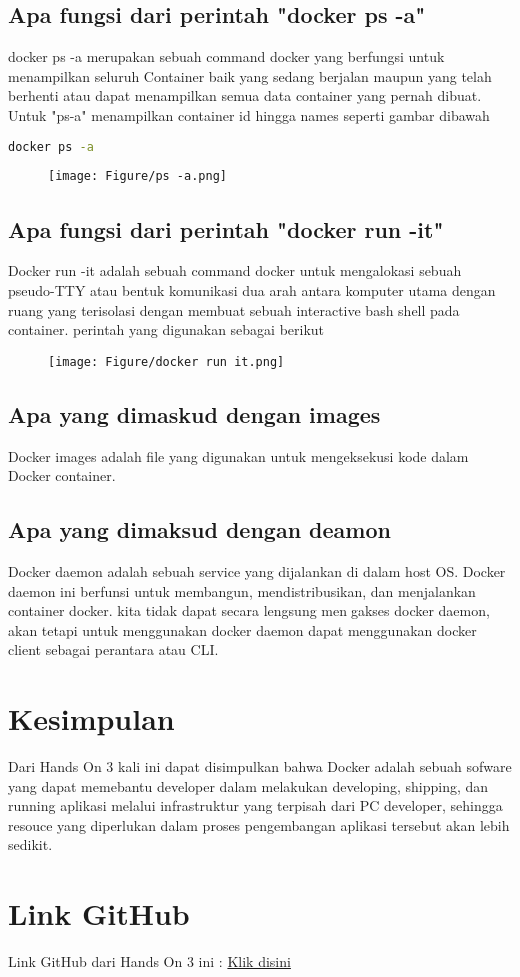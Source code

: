 \documentclass[11pt,a4paper]{article}
\begin{document}
\subsection{Apa fungsi dari perintah "docker ps -a"}

docker ps -a merupakan sebuah command docker yang berfungsi untuk menampilkan seluruh Container baik yang sedang berjalan maupun yang telah berhenti atau dapat menampilkan semua data container yang pernah
dibuat. Untuk "ps-a" menampilkan container id hingga names seperti gambar dibawah
\begin{lstlisting}[language = bash]
	docker ps -a
\end{lstlisting}
\begin{figure}[h]
	\centering
	\texttt{[image: Figure/ps -a.png]}
\end{figure}

\newpage
\subsection{Apa fungsi dari perintah "docker run -it"}
Docker run -it adalah sebuah command docker untuk mengalokasi sebuah pseudo-TTY atau bentuk komunikasi dua arah antara komputer utama dengan ruang yang terisolasi dengan membuat sebuah interactive
bash shell pada container. perintah yang digunakan sebagai berikut
\begin{figure}[h]
	\centering
	\texttt{[image: Figure/docker run it.png]}
\end{figure}


\subsection{Apa yang dimaskud dengan images}
Docker images adalah file yang digunakan untuk mengeksekusi kode dalam Docker container.

\subsection{Apa yang dimaksud dengan deamon}
Docker daemon adalah sebuah service yang dijalankan di dalam host OS. Docker daemon ini berfunsi untuk
membangun, mendistribusikan, dan menjalankan container docker. kita tidak dapat secara lengsung mengakses docker daemon, akan tetapi untuk menggunakan docker daemon dapat menggunakan docker client sebagai perantara atau CLI.\cite{contributor_2005}
\section{Kesimpulan}
Dari Hands On 3 kali ini dapat disimpulkan bahwa Docker adalah sebuah sofware yang dapat memebantu developer dalam melakukan developing, shipping, dan running aplikasi melalui infrastruktur yang terpisah dari PC developer, sehingga resouce yang diperlukan dalam proses pengembangan aplikasi tersebut akan lebih sedikit.

\section{Link GitHub}
	Link GitHub dari Hands On 3 ini : \href{https://github.com/dodisihombing016/HandsOn-3}{Klik disini}

\newpage


\end{document}
